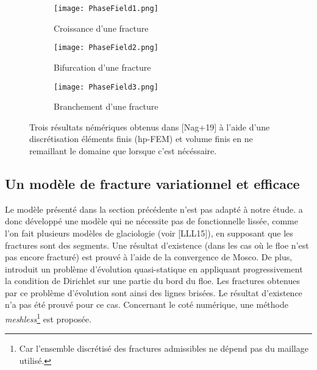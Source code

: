 \begin{figure}[!ht]
    \centering
    \begin{subfigure}[b]{0.9\textwidth}
        \centering
        \texttt{[image: PhaseField1.png]} 
        \caption{Croissance d’une fracture}
        \label{fig:PhaseField1}
    \end{subfigure}
    \begin{subfigure}[b]{0.9\textwidth}
        \centering
        \texttt{[image: PhaseField2.png]} 
        \caption{Bifurcation d’une fracture}
        \label{fig:PhaseField2}
    \end{subfigure}
    \begin{subfigure}[b]{0.9\textwidth}
        \centering
        \texttt{[image: PhaseField3.png]} 
        \caption{Branchement d’une fracture}
        \label{fig:PhaseField3}
    \end{subfigure}
       \caption{Trois résultats némériques obtenus dans [Nag+19] à l'aide d'une discrétisation éléments finis (hp-FEM) et volume finis en ne remaillant le domaine que lorsque c'est nécéssaire.}
       \label{fig:PhaseField}
\end{figure}


\subsection{Un modèle de fracture variationnel et efficace} 

Le modèle présenté dans la section précédente n'est pas adapté à notre étude. \citeauthor{balasoiu2020thesis} a donc développé une modèle qui ne nécessite pas de fonctionnelle lissée, comme l'on fait plusieurs modèles de glaciologie (voir [LLL15]), en supposant que les fractures sont des segments. Une résultat d'existence (dans les cas où le floe n'est pas encore fracturé) est prouvé à l'aide de la convergence de Mosco. De plus, \citeauthor{balasoiu2020thesis} introduit un problème d’évolution quasi-statique en appliquant progressivement la condition de Dirichlet sur une partie du bord du floe. Les fractures obtenues par ce problème d’évolution sont ainsi des lignes brisées. Le résultat d'existence n'a pas été prouvé pour ce cas. Concernant le coté numérique, une méthode \textit{meshless}\footnote{Car l’ensemble discrétisé des fractures admissibles ne dépend pas du maillage utilisé.} est proposée.

